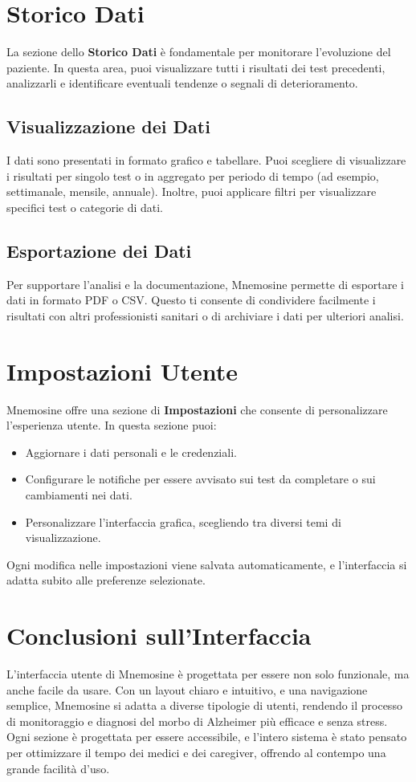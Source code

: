 \documentclass[a4paper,12pt]{book}
\begin{document}
	\section{Storico Dati}
	La sezione dello \textbf{Storico Dati} è fondamentale per monitorare l'evoluzione del paziente. In questa area, puoi visualizzare tutti i risultati dei test precedenti, analizzarli e identificare eventuali tendenze o segnali di deterioramento.
	
	\subsection{Visualizzazione dei Dati}
	I dati sono presentati in formato grafico e tabellare. Puoi scegliere di visualizzare i risultati per singolo test o in aggregato per periodo di tempo (ad esempio, settimanale, mensile, annuale). Inoltre, puoi applicare filtri per visualizzare specifici test o categorie di dati.
	
	\subsection{Esportazione dei Dati}
	Per supportare l'analisi e la documentazione, Mnemosine permette di esportare i dati in formato PDF o CSV. Questo ti consente di condividere facilmente i risultati con altri professionisti sanitari o di archiviare i dati per ulteriori analisi.
	
	\section{Impostazioni Utente}
	Mnemosine offre una sezione di \textbf{Impostazioni} che consente di personalizzare l’esperienza utente. In questa sezione puoi:
	\begin{itemize}
		\item Aggiornare i dati personali e le credenziali.
		\item Configurare le notifiche per essere avvisato sui test da completare o sui cambiamenti nei dati.
		\item Personalizzare l’interfaccia grafica, scegliendo tra diversi temi di visualizzazione.
	\end{itemize}
	
	Ogni modifica nelle impostazioni viene salvata automaticamente, e l’interfaccia si adatta subito alle preferenze selezionate.
	
	\section{Conclusioni sull'Interfaccia}
	L’interfaccia utente di Mnemosine è progettata per essere non solo funzionale, ma anche facile da usare. Con un layout chiaro e intuitivo, e una navigazione semplice, Mnemosine si adatta a diverse tipologie di utenti, rendendo il processo di monitoraggio e diagnosi del morbo di Alzheimer più efficace e senza stress. Ogni sezione è progettata per essere accessibile, e l’intero sistema è stato pensato per ottimizzare il tempo dei medici e dei caregiver, offrendo al contempo una grande facilità d'uso.
	
\end{document}

